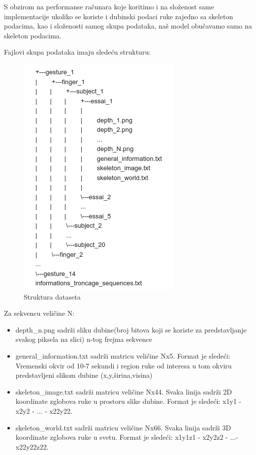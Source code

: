 \documentclass{article}
\begin{document}
S obzirom na performanse računara koje koritimo i na složenost same implementacije ukoliko se koriste i dubinski podaci ruke zajedno sa skeleton podacima, kao i složenosti samog skupa podataka, naš model obučavamo samo na skeleton podacima.\break

Fajlovi skupa podataka imaju sledeću strukturu:

\begin{figure}[ht]
\centering
\includegraphics[scale=0.4]{datasetOpis.png}
\caption{Struktura dataseta}
\end{figure}

\newpage



Za sekvencu veličine N:
\begin{itemize}
    \item depth\_n.png sadrži sliku dubine(broj bitova koji se koriste za predstavljanje svakog piksela na slici) n-tog frejma sekvence
    \item general\_information.txt sadrži matricu veličine Nx5. Format je sledeći: Vremenski okvir od 10-7 sekundi i region ruke od interesa u tom okviru predstavljeni slikom dubine (x,y,širina,visina)
    \item skeleton\_image.txt sadrži matricu veličine Nx44. Svaka linija sadrži 2D koordinate zglobova ruke u prostoru slike dubine. Format je sledeći: x1y1 - x2y2 - ... - x22y22.
    \item skeleton\_world.txt sadrži matricu veličine Nx66. Svaka linija sadrži 3D koordinate zglobova ruke u svetu. Format je sledeći: x1y1z1 - x2y2z2 - ...- x22y22z22.
\end{itemize}
\end{document}
